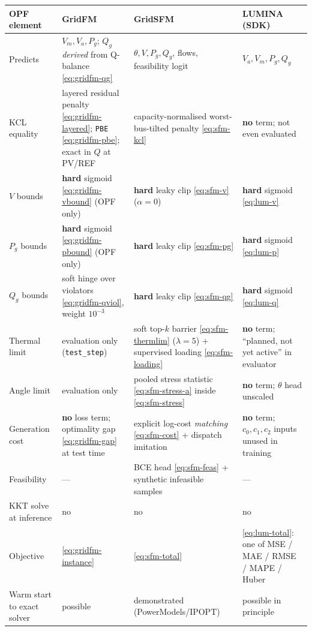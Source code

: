 \documentclass[11pt]{article}
\newcommand{\code}[1]{\texttt{\small #1}}
\begin{document}
\renewcommand{\arraystretch}{1.25}
\begin{longtable}{@{}p{}p{}p{}p{}@{}}
\toprule
\textbf{OPF element} & \textbf{GridFM} & \textbf{GridSFM} & \textbf{LUMINA} (SDK)\\
\midrule
\endhead
Predicts & $V_m,V_a,P_g$; $Q_g$ \emph{derived} from Q-balance \eqref{eq:gridfm-qg}
         & $\theta,V,P_g,Q_g$, flows, feasibility logit
         & $V_a,V_m,P_g,Q_g$ \\
KCL equality
         & layered residual penalty \eqref{eq:gridfm-layered}; \code{PBE} \eqref{eq:gridfm-pbe}; exact in $Q$ at PV/REF
         & capacity-normalised worst-bus-tilted penalty \eqref{eq:sfm-kcl}
         & \textbf{no} term; not even evaluated \\
$V$ bounds
         & \textbf{hard} sigmoid \eqref{eq:gridfm-vbound} (OPF only)
         & \textbf{hard} leaky clip \eqref{eq:sfm-v} ($\alpha{=}0$)
         & \textbf{hard} sigmoid \eqref{eq:lum-v} \\
$P_g$ bounds
         & \textbf{hard} sigmoid \eqref{eq:gridfm-pbound} (OPF only)
         & \textbf{hard} leaky clip \eqref{eq:sfm-pg}
         & \textbf{hard} sigmoid \eqref{eq:lum-p} \\
$Q_g$ bounds
         & soft hinge over violators \eqref{eq:gridfm-qviol}, weight $10^{-3}$
         & \textbf{hard} leaky clip \eqref{eq:sfm-qg}
         & \textbf{hard} sigmoid \eqref{eq:lum-q} \\
Thermal limit
         & evaluation only (\code{test\_step})
         & soft top-$k$ barrier \eqref{eq:sfm-thermlim} ($\lambda{=}5$) + supervised loading \eqref{eq:sfm-loading}
         & \textbf{no} term; ``planned, not yet active'' in evaluator \\
Angle limit
         & evaluation only
         & pooled stress statistic \eqref{eq:sfm-stress-a} inside \eqref{eq:sfm-stress}
         & \textbf{no} term; $\theta$ head unscaled \\
Generation cost
         & \textbf{no} loss term; optimality gap \eqref{eq:gridfm-gap} at test time
         & explicit log-cost \emph{matching} \eqref{eq:sfm-cost} + dispatch imitation
         & \textbf{no} term; $c_0,c_1,c_2$ inputs unused in training \\
Feasibility
         & --- & BCE head \eqref{eq:sfm-feas} + synthetic infeasible samples & --- \\
KKT solve at inference & no & no & no \\
Objective & \eqref{eq:gridfm-instance} & \eqref{eq:sfm-total} & \eqref{eq:lum-total}: one of MSE / MAE / RMSE / MAPE / Huber \\
Warm start to exact solver & possible & demonstrated (PowerModels/IPOPT) & possible in principle \\
\bottomrule
\end{longtable}
\end{document}
